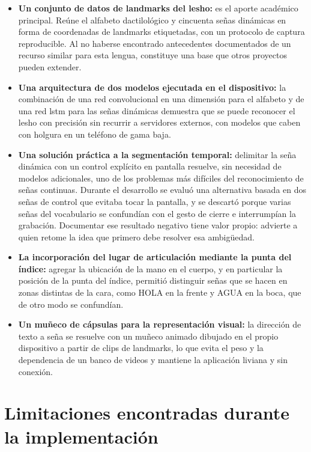 \begin{itemize}
    \item \textbf{Un conjunto de datos de landmarks del \Acrshort{lesho}:} es el aporte académico principal. Reúne el alfabeto dactilológico y cincuenta señas dinámicas en forma de coordenadas de landmarks etiquetadas, con un protocolo de captura reproducible. Al no haberse encontrado antecedentes documentados de un recurso similar para esta lengua, constituye una base que otros proyectos pueden extender.
    \item \textbf{Una arquitectura de dos modelos ejecutada en el dispositivo:} la combinación de una red convolucional en una dimensión para el alfabeto y de una red \Acrshort{lstm} para las señas dinámicas demuestra que se puede reconocer el \Acrshort{lesho} con precisión sin recurrir a servidores externos, con modelos que caben con holgura en un teléfono de gama baja.
    \item \textbf{Una solución práctica a la segmentación temporal:} delimitar la seña dinámica con un control explícito en pantalla resuelve, sin necesidad de modelos adicionales, uno de los problemas más difíciles del reconocimiento de señas continuas. Durante el desarrollo se evaluó una alternativa basada en dos señas de control que evitaba tocar la pantalla, y se descartó porque varias señas del vocabulario se confundían con el gesto de cierre e interrumpían la grabación. Documentar ese resultado negativo tiene valor propio: advierte a quien retome la idea que primero debe resolver esa ambigüedad.
    \item \textbf{La incorporación del lugar de articulación mediante la punta del índice:} agregar la ubicación de la mano en el cuerpo, y en particular la posición de la punta del índice, permitió distinguir señas que se hacen en zonas distintas de la cara, como HOLA en la frente y AGUA en la boca, que de otro modo se confundían.
    \item \textbf{Un muñeco de cápsulas para la representación visual:} la dirección de texto a seña se resuelve con un muñeco animado dibujado en el propio dispositivo a partir de clips de landmarks, lo que evita el peso y la dependencia de un banco de videos y mantiene la aplicación liviana y sin conexión.
\end{itemize}

\section{Limitaciones encontradas durante la implementación}

